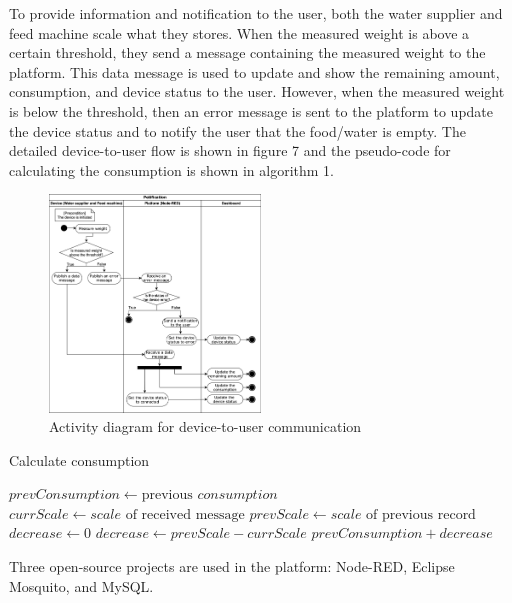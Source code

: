 ﻿\documentclass[conference]{IEEEtran}
\begin{document}
To provide information and notification to the user, both the water supplier and feed machine scale what they stores.
When the measured weight is above a certain threshold, they send a message containing the measured weight to the platform.
This data message is used to update and show the remaining amount, consumption, and device status to the user.
However, when the measured weight is below the threshold, then an error message is sent to the platform to update the device status and to notify the user that the food/water is empty.
The detailed device-to-user flow is shown in figure 7 and the pseudo-code for calculating the consumption is shown in algorithm 1.

\begin{figure}[htbp]
\centerline{\includegraphics[width=0.5\textwidth]{./images/device2user.png}}
\caption{Activity diagram for device-to-user communication}
\label{fig}
\end{figure}

\begin{algorithm}
\caption{Calculate consumption}\label{algo}
\begin{algorithmic}[1]
        \State $prevConsumption \gets \text{previous } \textit{consumption}$
        \State $currScale \gets \textit{scale} \text{ of received message}$
        \State $prevScale \gets \textit{scale} \text{ of  previous record}$
        \State $decrease \gets 0$
            \State $decrease \gets prevScale - currScale$
        \EndIf
        \Return $prevConsumption + decrease$
    \EndProcedure
\end{algorithmic}
\end{algorithm}

Three open-source projects are used in the platform: Node-RED, Eclipse Mosquito, and MySQL.
\end{document}
